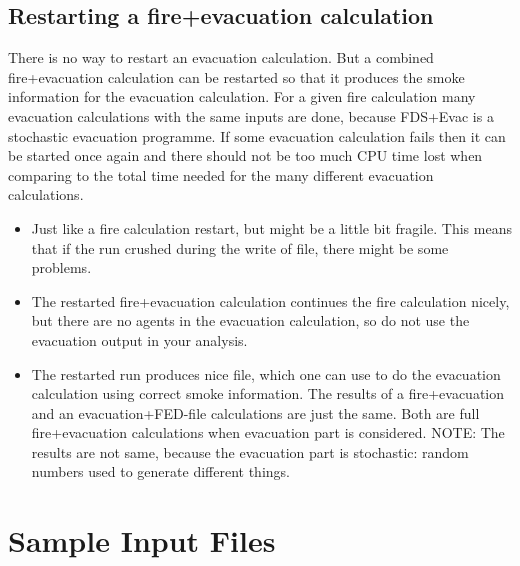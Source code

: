 \documentclass[12pt,a4paper,final,twoside]{stylevk}
\begin{document}
\section{Restarting a fire+evacuation calculation}\label{Sec_Restart}

\noindent There is no way to restart an evacuation calculation.  But a
combined fire+evacuation calculation can be restarted so that it
produces the smoke information for the evacuation calculation.  For a
given fire calculation many evacuation calculations with the same
inputs are done, because FDS+Evac is a stochastic evacuation
programme.  If some evacuation calculation fails then it can be
started once again and there should not be too much CPU time lost when
comparing to the total time needed for the many different evacuation
calculations.
%
\begin{itemize}
%
\item Just like a fire calculation restart, but might be a little bit
  fragile.  This means that if the run crushed during the write of
   file, there might be some problems.
  
\item The restarted fire+evacuation calculation continues the fire
  calculation nicely, but there are no agents in the evacuation
  calculation, so do not use the evacuation output in your analysis.
  
\item The restarted run produces nice  file,
  which one can use to do the evacuation calculation using correct
  smoke information.  The results of a fire+evacuation and an
  evacuation+FED-file calculations are just the same.  Both are full
  fire+evacuation calculations when evacuation part is considered.
  NOTE: The results are not same, because the evacuation part is
  stochastic: random numbers used to generate different things.
%
\end{itemize}


\clearpage

\newpage


\chapter{Sample Input Files}\label{Sec_SampleFile}
\end{document}
